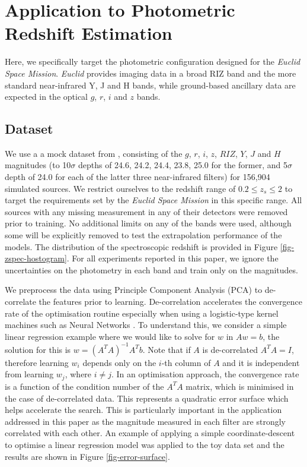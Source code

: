 \documentclass[useAMS,usenatbib,fleqn]{mn2e}
\begin{document}
\section{Application to Photometric Redshift Estimation}
\label{sec-application}

Here, we specifically target the photometric configuration designed for the {\em Euclid Space Mission}. {\em Euclid} provides imaging data in a broad RIZ band and the more standard near-infrared Y, J and H bands, while ground-based ancillary data are expected in the optical $g$, $r$, $i$ and $z$ bands. 


\subsection{Dataset}
\label{sec-dataset}

We use a a mock dataset from \citet{jouvel09}, consisting of the $g$, $r$, $i$, $z$, $RIZ$, $Y$, $J$ and $H$ magnitudes (to 10$\sigma$ depths of 24.6, 24.2, 24.4, 23.8, 25.0 for the former, and 5$\sigma$ depth of 24.0 for each of the latter three near-infrared filters) for 156,904 simulated sources. We restrict ourselves to the redshift range of $0.2 \le z_{s} \le 2$ to target the requirements set by the {\em Euclid Space Mission} in this specific range. All sources with any missing measurement in any of their detectors were removed prior to training. No additional limits on any of the bands were used, although some will be explicitly removed to test the extrapolation performance of the models. The distribution of the spectroscopic redshift is provided in Figure \ref{fig-zspec-hostogram}. For all experiments reported in this paper, we ignore the uncertainties on the photometry in each band and train only on the magnitudes. 

We preprocess the data using Principle Component Analysis (PCA) \citep{jolliffe1986} to de-correlate the features prior to learning. De-correlation accelerates the convergence rate of the optimisation routine especially when using a logistic-type kernel machines such as Neural Networks \citep{lecun1998}. To understand this, we consider a simple linear regression example where we would like to solve for $w$ in $Aw=b$, the solution for this is $w=\left(A^{T}A\right)^{-1}A^{T}b$. Note that if $A$ is de-correlated $A^{T}A=I$, therefore learning $w_{i}$ depends only on the $i$-th column of $A$ and it is independent from learning $w_{j}$, where $i\ne j$. In an optimisation approach, the convergence rate is a function of the condition number of the $A^{T}A$ matrix, which is minimised in the case of de-correlated data. This represents a quadratic error surface which helps accelerate the search. This is particularly important in the application addressed in this paper as the magnitude measured in each filter are strongly correlated with each other. An example of applying a simple coordinate-descent to optimise a linear regression model was applied to the toy data set and the results are shown in Figure \ref{fig-error-surface}.
\end{document}
